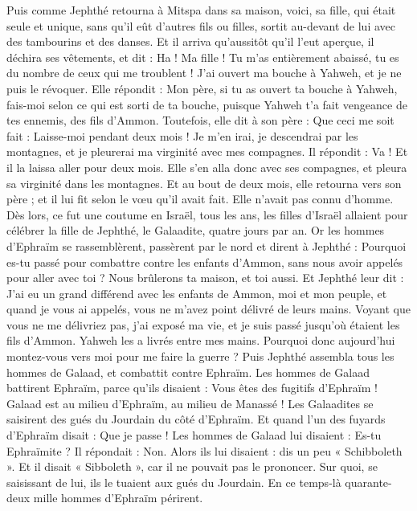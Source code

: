 \begin{multicols}{2}
Puis comme Jephthé retourna à Mitspa dans sa maison, voici, sa fille, qui était seule et unique, sans qu'il eût d'autres fils ou filles, sortit au-devant de lui avec des tambourins et des danses.
Et il arriva qu'aussitôt qu'il l'eut aperçue, il déchira ses vêtements, et dit : Ha ! Ma fille ! Tu m'as entièrement abaissé, tu es du nombre de ceux qui me troublent ! J'ai ouvert ma bouche à Yahweh, et je ne puis le révoquer.
Elle répondit : Mon père, si tu as ouvert ta bouche à Yahweh, fais-moi selon ce qui est sorti de ta bouche, puisque Yahweh t'a fait vengeance de tes ennemis, des fils d'Ammon.
Toutefois, elle dit à son père : Que ceci me soit fait : Laisse-moi pendant deux mois ! Je m'en irai, je descendrai par les montagnes, et je pleurerai ma virginité avec mes compagnes.
Il répondit : Va ! Et il la laissa aller pour deux mois. Elle s'en alla donc avec ses compagnes, et pleura sa virginité dans les montagnes.
Et au bout de deux mois, elle retourna vers son père ; et il lui fit selon le vœu qu'il avait fait. Elle n'avait pas connu d'homme. Dès lors, ce fut une coutume en Israël,
tous les ans, les filles d'Israël allaient pour célébrer la fille de Jephthé, le Galaadite, quatre jours par an.
\VerseOne{}Or les hommes d'Ephraïm se rassemblèrent, passèrent par le nord et dirent à Jephthé : Pourquoi es-tu passé pour combattre contre les enfants d'Ammon, sans nous avoir appelés pour aller avec toi ? Nous brûlerons ta maison, et toi aussi.
Et Jephthé leur dit : J'ai eu un grand différend avec les enfants de Ammon, moi et mon peuple, et quand je vous ai appelés, vous ne m'avez point délivré de leurs mains.
Voyant que vous ne me délivriez pas, j'ai exposé ma vie, et je suis passé jusqu'où étaient les fils d'Ammon. Yahweh les a livrés entre mes mains. Pourquoi donc aujourd'hui montez-vous vers moi pour me faire la guerre ?
Puis Jephthé assembla tous les hommes de Galaad, et combattit contre Ephraïm. Les hommes de Galaad battirent Ephraïm, parce qu'ils disaient : Vous êtes des fugitifs d'Ephraïm ! Galaad est au milieu d'Ephraïm, au milieu de Manassé !
Les Galaadites se saisirent des gués du Jourdain du côté d'Ephraïm. Et quand l'un des fuyards d'Ephraïm disait : Que je passe ! Les hommes de Galaad lui disaient : Es-tu Ephraïmite ? Il répondait : Non.
Alors ils lui disaient : dis un peu « Schibboleth ». Et il disait « Sibboleth », car il ne pouvait pas le prononcer. Sur quoi, se saisissant de lui, ils le tuaient aux gués du Jourdain. En ce temps-là quarante-deux mille hommes d'Ephraïm périrent.

\end{multicols}
